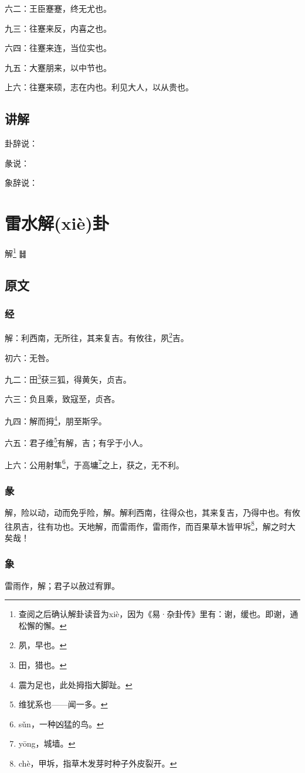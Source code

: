 \documentclass[12pt,oneside]{book}
\begin{document}
六二：王臣蹇蹇，终无尤也。

九三：往蹇来反，内喜之也。

六四：往蹇来连，当位实也。

九五：大蹇朋来，以中节也。

上六：往蹇来硕，志在内也。利见大人，以从贵也。

\section{讲解}
卦辞说：

彖说：

象辞说：

\chapter{雷水解(xiè)卦}
解\footnote{查阅之后确认解卦读音为xiè，因为《易·杂卦传》里有：谢，缓也。即谢，通松懈的懈。} {\Large ䷧}

\section{原文}

\subsection{经}
解：利西南，无所往，其来复吉。有攸往，夙\footnote{夙，早也。}吉。

初六：无咎。

九二：田\footnote{田，猎也。}获三狐，得黄矢，贞吉。

六三：负且乘，致寇至，贞吝。

九四：解而拇\footnote{震为足也，此处拇指大脚趾。}，朋至斯孚。

六五：君子维\footnote{维犹系也——闻一多。}有解，吉；有孚于小人。

上六：公用射隼\footnote{sǔn，一种凶猛的鸟。}，于高墉\footnote{yōng，城墙。}之上，获之，无不利。

\subsection{彖}
解，险以动，动而免乎险，解。解利西南，往得众也，其来复吉，乃得中也。有攸往夙吉，往有功也。天地解，而雷雨作，雷雨作，而百果草木皆甲坼\footnote{chè，甲坼，指草木发芽时种子外皮裂开。}，解之时大矣哉！

\subsection{象}
雷雨作，解；君子以赦过宥罪。
\end{document}
